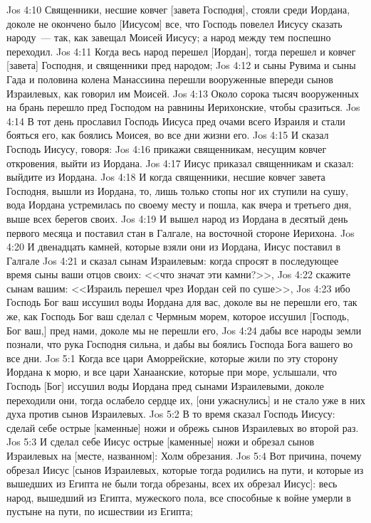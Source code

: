 \vs Jos 4:10 Священники, несшие ковчег [завета Господня], стояли среди Иордана, доколе не окончено было [Иисусом] все, что Господь повелел Иисусу сказать народу~--- так, как завещал Моисей Иисусу; а народ между тем поспешно переходил.
\vs Jos 4:11 Когда весь народ перешел [Иордан], тогда перешел и ковчег [завета] Господня, и священники пред народом;
\vs Jos 4:12 и сыны Рувима и сыны Гада и половина колена Манассиина перешли вооруженные впереди сынов Израилевых, как говорил им Моисей.
\vs Jos 4:13 Около сорока тысяч вооруженных на брань перешло пред Господом на равнины Иерихонские, чтобы сразиться.
\rsbpar\vs Jos 4:14 В тот день прославил Господь Иисуса пред очами всего Израиля и стали бояться его, как боялись Моисея, во все дни жизни его.
\vs Jos 4:15 И сказал Господь Иисусу, говоря:
\vs Jos 4:16 прикажи священникам, несущим ковчег откровения, выйти из Иордана.
\vs Jos 4:17 Иисус приказал священникам и сказал: выйдите из Иордана.
\vs Jos 4:18 И когда священники, несшие ковчег завета Господня, вышли из Иордана, то, лишь только стопы ног их ступили на сушу, вода Иордана устремилась по своему месту и пошла, как вчера и третьего дня, выше всех берегов своих.
\vs Jos 4:19 И вышел народ из Иордана в десятый день первого месяца и поставил стан в Галгале, на восточной стороне Иерихона.
\vs Jos 4:20 И двенадцать камней, которые взяли они из Иордана, Иисус поставил в Галгале
\vs Jos 4:21 и сказал сынам Израилевым: когда спросят в последующее время сыны ваши отцов своих: <<что значат эти камни?>>,
\vs Jos 4:22 скажите сынам вашим: <<Израиль перешел чрез Иордан сей по суше>>,
\vs Jos 4:23 ибо Господь Бог ваш иссушил воды Иордана для вас, доколе вы не перешли его, так же, как Господь Бог ваш сделал с Чермным морем, которое иссушил [Господь, Бог ваш,] пред нами, доколе мы не перешли его,
\vs Jos 4:24 дабы все народы земли познали, что рука Господня сильна, и дабы вы боялись Господа Бога вашего во все дни.
\vs Jos 5:1 Когда все цари Аморрейские, которые жили по эту сторону Иордана к морю, и все цари Ханаанские, которые при море, услышали, что Господь [Бог] иссушил воды Иордана пред сынами Израилевыми, доколе переходили они, тогда ослабело сердце их, [они ужаснулись] и не стало уже в них духа против сынов Израилевых.
\rsbpar\vs Jos 5:2 В то время сказал Господь Иисусу: сделай себе острые [каменные] ножи и обрежь сынов Израилевых во второй раз.
\vs Jos 5:3 И сделал себе Иисус острые [каменные] ножи и обрезал сынов Израилевых на [месте, названном]: Холм обрезания.
\vs Jos 5:4 Вот причина, почему обрезал Иисус [сынов Израилевых, которые тогда родились на пути, и которые из вышедших из Египта не были тогда обрезаны, всех их обрезал Иисус]: весь народ, вышедший из Египта, мужеского пола, все способные к войне умерли в пустыне на пути, по исшествии из Египта;
